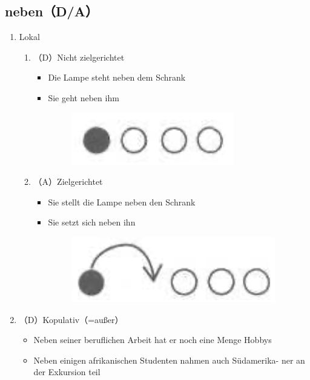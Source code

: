 \documentclass[UTF8]{report}
\begin{document}
\subsection{neben（D/A）}
\begin{enumerate}
    \item Lokal
    \begin{enumerate}
        \item（D）Nicht zielgerichtet
        \begin{itemize}
            \item Die Lampe steht neben dem Schrank
            \item Sie geht neben ihm
            \begin{figure}[H]
                \centering
                \includegraphics[scale=0.3]{neben1.png}
            \end{figure}
        \end{itemize}
        \item（A）Zielgerichtet
        \begin{itemize}
            \item Sie stellt die Lampe neben den Schrank
            \item Sie setzt sich neben ihn
            \begin{figure}[H]
                \centering
                \includegraphics[scale=0.3]{neben2.png}
            \end{figure}
        \end{itemize}
    \end{enumerate}
    \item（D）Kopulativ（=außer）
    \begin{itemize}
        \item Neben seiner beruflichen Arbeit hat er noch eine Menge Hobbys
        \item Neben einigen afrikanischen Studenten nahmen auch Südamerika- ner an der Exkursion teil
    \end{itemize}
\end{enumerate}
\end{document}
